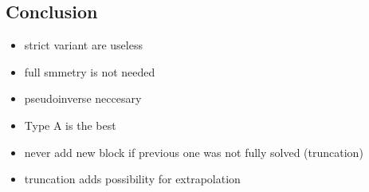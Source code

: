 





\subsection{Conclusion}

\begin{itemize}
  \item strict variant are useless 
  \item full smmetry is not needed
  \item pseudoinverse neccesary
  \item Type A is the best
  \item never add new block if previous one was not fully solved (truncation)
  \item truncation adds possibility for extrapolation
\end{itemize}
